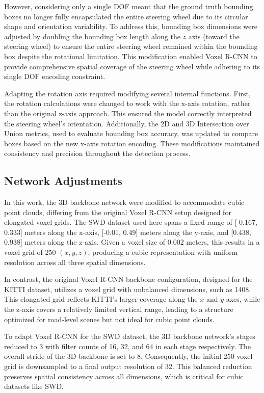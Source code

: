 However, considering only a single DOF meant that the ground truth bounding boxes no longer fully encapsulated the entire steering wheel due to its circular shape and orientation variability. To address this, bounding box dimensions were adjusted by doubling the bounding box length along the \(z\) axis (toward the steering wheel) to ensure the entire steering wheel remained within the bounding box despite the rotational limitation. This modification enabled Voxel R-CNN to provide comprehensive spatial coverage of the steering wheel while adhering to its single DOF encoding constraint.



Adapting the rotation axis required modifying several internal functions. First, the rotation calculations were changed to work with the x-axis rotation, rather than the original z-axis approach. This ensured the model correctly interpreted the steering wheel's orientation. Additionally, the 2D and 3D Intersection over Union metrics, used to evaluate bounding box accuracy, was updated to compare boxes based on the new x-axis rotation encoding. These modifications maintained consistency and precision throughout the detection process.


\subsection{Network Adjustments}
In this work, the 3D backbone network were modified to accommodate cubic point clouds, differing from the original Voxel R-CNN setup designed for elongated voxel grids. The SWD dataset used here spans a fixed range of [-0.167, 0.333] meters along the x-axis, [-0.01, 0.49] meters along the y-axis, and [0.438, 0.938] meters along the z-axis. Given a voxel size of 0.002 meters, this results in a voxel grid of 250 \((x, y, z)\), producing a cubic representation with uniform resolution across all three spatial dimensions.


In contrast, the original Voxel R-CNN backbone configuration, designed for the KITTI dataset, utilizes a voxel grid with unbalanced dimensions, such as 1408. This elongated grid reflects KITTI’s larger coverage along the \(x\) and \(y\) axes, while the z-axis covers a relatively limited vertical range, leading to a structure optimized for road-level scenes but not ideal for cubic point clouds.


To adapt Voxel R-CNN for the SWD dataset, the 3D backbone network’s stages reduced to 3 with filter counts of 16, 32, and 64 in each stage respectively. The overall stride of the 3D backbone is set to 8. Consequently, the initial 250 voxel grid is downsampled to a final output resolution of 32. This balanced reduction preserves spatial consistency across all dimensions, which is critical for cubic datasets like SWD.


